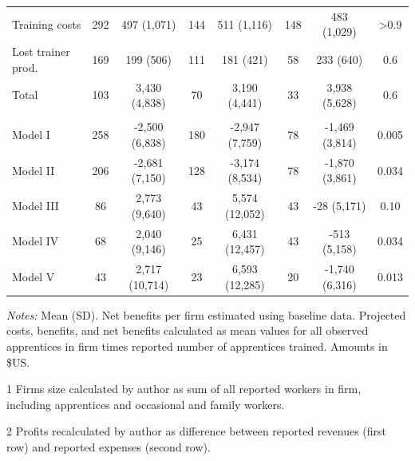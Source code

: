 \documentclass[
  a4paper, twoside, 12pt]{book}
\begin{document}
\begin{table}[H]
{\begin{threeparttable}
\begin{tabular}[t]{lccccccc}
\hspace{1em}Training costs & 292 & 497 (1,071) & 144 & 511 (1,116) & 148 & 483 (1,029) & >0.9\\
\hspace{1em}Lost trainer prod. & 169 & 199 (506) & 111 & 181 (421) & 58 & 233 (640) & 0.6\\
\hspace{1em}Total & 103 & 3,430 (4,838) & 70 & 3,190 (4,441) & 33 & 3,938 (5,628) & 0.6\\
\addlinespace[0.3em]
\multicolumn{8}{l}{\textbf{Net benefits}}\\
\hspace{1em}Model I & 258 & -2,500 (6,838) & 180 & -2,947 (7,759) & 78 & -1,469 (3,814) & 0.005\\
\hspace{1em}Model II & 206 & -2,681 (7,150) & 128 & -3,174 (8,534) & 78 & -1,870 (3,861) & 0.034\\
\hspace{1em}Model III & 86 & 2,773 (9,640) & 43 & 5,574 (12,052) & 43 & -28 (5,171) & 0.10\\
\hspace{1em}Model IV & 68 & 2,040 (9,146) & 25 & 6,431 (12,457) & 43 & -513 (5,158) & 0.034\\
\hspace{1em}Model V & 43 & 2,717 (10,714) & 23 & 6,593 (12,285) & 20 & -1,740 (6,316) & 0.013\\
\bottomrule
\end{tabular}
\begin{tablenotes}
\small
\item \textit{Notes:} Mean (SD). Net benefits per firm estimated using baseline data. 
Projected costs, benefits, and net benefits calculated as mean values for all observed apprentices in 
firm times reported number of apprentices trained. Amounts in \$US.
\item[1] Firms size calculated by author as sum of all reported workers in firm, including apprentices and occasional and family workers.
\item[2] Profits recalculated by author as difference between reported revenues (first row) and reported expenses (second row).
\end{tablenotes}
\end{threeparttable}}
\end{table}
\end{document}
